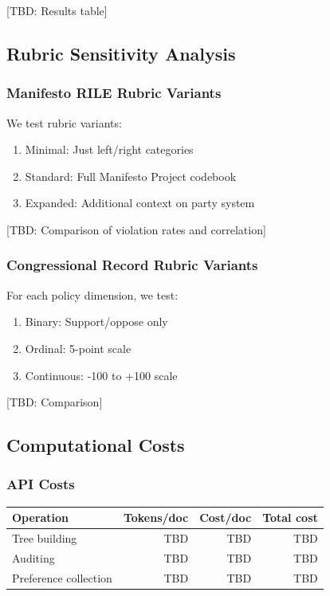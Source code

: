 [TBD: Results table]

\subsection{Rubric Sensitivity Analysis}

\subsubsection{Manifesto RILE Rubric Variants}

We test rubric variants:
\begin{enumerate}[nosep]
    \item Minimal: Just left/right categories
    \item Standard: Full Manifesto Project codebook
    \item Expanded: Additional context on party system
\end{enumerate}

[TBD: Comparison of violation rates and correlation]

\subsubsection{Congressional Record Rubric Variants}

For each policy dimension, we test:
\begin{enumerate}[nosep]
    \item Binary: Support/oppose only
    \item Ordinal: 5-point scale
    \item Continuous: -100 to +100 scale
\end{enumerate}

[TBD: Comparison]

\subsection{Computational Costs}

\subsubsection{API Costs}

\begin{center}
\begin{tabular}{lrrr}
\toprule
Operation & Tokens/doc & Cost/doc & Total cost \\
\midrule
Tree building & TBD & TBD & TBD \\
Auditing & TBD & TBD & TBD \\
Preference collection & TBD & TBD & TBD \\
\bottomrule
\end{tabular}
\end{center}

